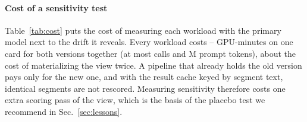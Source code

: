 \documentclass[conference]{IEEEtran}
\begin{document}
\paragraph*{Cost of a sensitivity test} Table~\ref{tab:cost} puts the cost of measuring each workload with the primary
model next to the drift it reveals. Every workload costs \nCostMinMin--\nCostMinMax{} GPU-minutes on one card for
both versions together (at most \nCostCallsMax{} calls and \nCostTokMax{}M prompt tokens), about the cost of
materializing the view twice. A pipeline that already holds the old version pays only for the new one, and with the
result cache keyed by segment text, identical segments are not rescored. Measuring sensitivity therefore costs one
extra scoring pass of the view, which is the basis of the placebo test we recommend in Sec.~\ref{sec:lessons}.
\begin{table}[t]
\centering\footnotesize
\caption{Cost of measuring each workload on held-out data with the primary model (one TITAN Xp, fp32): scorer calls and
prompt tokens for both versions, GPU-minutes (min) at the measured scoring rates, and the median drift of the primary query
(Q1 for meetings, Qd1 for documents). Window drifts take few distinct values, so the median can equal an interval end (Sec.~\ref{sec:rq3}). $^\dagger$Converted from prompt tokens at the measured rate of the Wikipedia run;
the 100- and 150-word windows were scored on another host.}
\label{tab:cost}
\setlength{\tabcolsep}{3pt}

\end{table}
\end{document}
